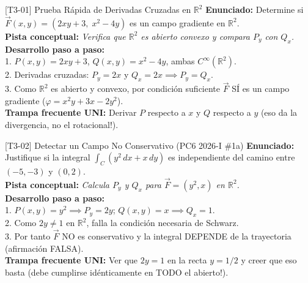 \documentclass[11pt,a4paper]{article}
\begin{document}
\begin{ejerciciobox}{[T3-01] Prueba Rápida de Derivadas Cruzadas en $\mathbb{R}^2$}
\textbf{Enunciado:} Determine si $\vec{F}(x,y) = (2xy + 3,\; x^2 - 4y)$ es un campo gradiente en $\mathbb{R}^2$.\\[0.2cm]
\textbf{Pista conceptual:} \emph{Verifica que $\mathbb{R}^2$ es abierto convexo y compara $P_y$ con $Q_x$.}\\[0.2cm]
\textbf{Desarrollo paso a paso:}\\
1. $P(x,y) = 2xy + 3$, $Q(x,y) = x^2 - 4y$, ambas $C^\infty(\mathbb{R}^2)$.\\
2. Derivadas cruzadas: $P_y = 2x$ y $Q_x = 2x \implies P_y = Q_x$.\\
3. Como $\mathbb{R}^2$ es abierto y convexo, por condición suficiente $\vec{F}$ SÍ es un campo gradiente ($\varphi = x^2y + 3x - 2y^2$).\\[0.2cm]
\textbf{Trampa frecuente UNI:} Derivar $P$ respecto a $x$ y $Q$ respecto a $y$ (eso da la divergencia, no el rotacional!).
\end{ejerciciobox}

\begin{ejerciciobox}{[T3-02] Detectar un Campo No Conservativo (PC6 2026-I \#1a)}
\textbf{Enunciado:} Justifique si la integral $\int_C (y^2\,dx + x\,dy)$ es independiente del camino entre $(-5,-3)$ y $(0,2)$.\\[0.2cm]
\textbf{Pista conceptual:} \emph{Calcula $P_y$ y $Q_x$ para $\vec{F} = (y^2, x)$ en $\mathbb{R}^2$.}\\[0.2cm]
\textbf{Desarrollo paso a paso:}\\
1. $P(x,y) = y^2 \implies P_y = 2y$; $Q(x,y) = x \implies Q_x = 1$.\\
2. Como $2y \neq 1$ en $\mathbb{R}^2$, falla la condición necesaria de Schwarz.\\
3. Por tanto $\vec{F}$ NO es conservativo y la integral DEPENDE de la trayectoria (afirmación FALSA).\\[0.2cm]
\textbf{Trampa frecuente UNI:} Ver que $2y = 1$ en la recta $y = 1/2$ y creer que eso basta (debe cumplirse idénticamente en TODO el abierto!).
\end{ejerciciobox}
\end{document}
